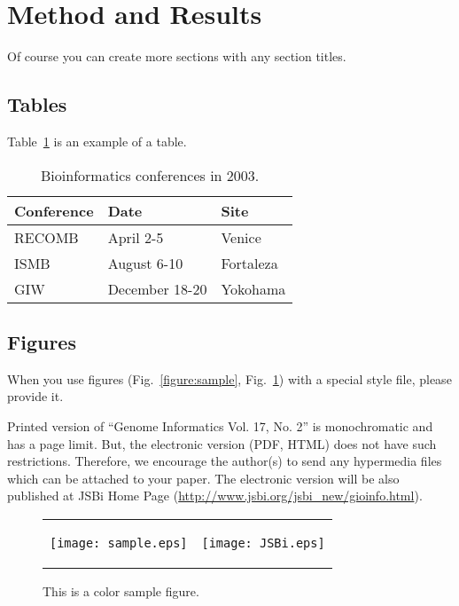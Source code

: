 \documentclass[twoside,11pt]{article}
\begin{document}
\section{Method and Results}

Of course you can create more sections with any section titles.

\subsection{Tables}

Table~\ref{table:sample} is an example of a table.

\begin{table}[h]
\caption{Bioinformatics conferences in 2003.}
\label{table:sample}
\begin{center}
\begin{tabular}{lll} \hline
Conference  & Date          & Site \\ \hline
RECOMB      & April 2-5     & Venice \\
ISMB        & August 6-10   & Fortaleza \\
GIW         & December 18-20& Yokohama \\ \hline
\end{tabular}
\end{center}
\end{table}

\subsection{Figures}

When you use figures (Fig.~\ref{figure:sample}, Fig.~\ref{figure:color})
with a special style file, please provide it.

Printed version of ``Genome Informatics Vol. 17, No. 2'' is
monochromatic and has a page limit. But, the electronic version (PDF,
HTML) does not have such restrictions. Therefore, we encourage the
author(s) to send any hypermedia files which can be attached to your
paper. The electronic version will be also published at JSBi Home Page
(\url{http://www.jsbi.org/jsbi_new/gioinfo.html}).

\begin{figure}
\begin{center}
\begin{tabular}{cc}
\begin{minipage}[t]{7cm}
\begin{center}
\texttt{[image: sample.eps]}
\end{center}
\caption{This is a sample figure. }
\label{figure:sample}
\end{minipage}
&
\begin{minipage}[t]{8cm}
\begin{center}
\texttt{[image: JSBi.eps]}
\end{center}
\caption{This is a color sample figure. }
\label{figure:color}
\end{minipage}
\end{tabular}
\end{center}
\end{figure}
\end{document}
